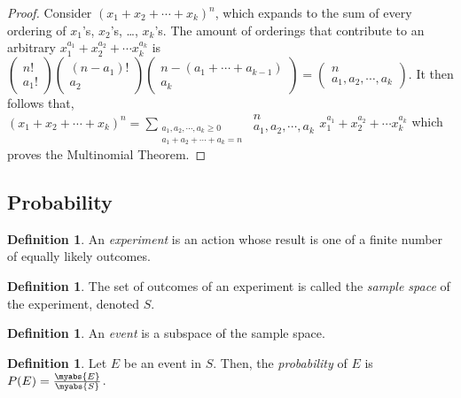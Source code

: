 \documentclass[11pt]{article}
\theoremstyle{definition}
\newtheorem{definition}[theorem]{Definition}
\begin{document}
\begin{proof}
    Consider ${(x_1+x_2+\cdots +x_k)}^n$, which expands to the sum of every ordering of $x_1$'s, $x_2$'s, \ldots, $x_k$'s. The amount of orderings that contribute to an arbitrary $x_1^{a_1} + x_2^{a_2} + \cdots x_k^{a_k}$ is $(\begin{smallmatrix} n!\\a_1! \end{smallmatrix})(\begin{smallmatrix} (n-a_1)!\\a_2 \end{smallmatrix})(\begin{smallmatrix} n-(a_1+\cdots+a_{k-1})\\a_k \end{smallmatrix}) = (\begin{smallmatrix} n \\ a_1,a_2,\cdots,a_k \end{smallmatrix})$. It then follows that, \\
        ${(x_1+x_2+\cdots+x_k)}^{n}=\sum_{\substack{a_1,a_2,\cdots,a_k \geq 0 \\ a_1+a_2+\cdots+a_k=n}}
        \begin{smallmatrix} n \\ a_1,a_2,\cdots,a_k \end{smallmatrix}
        x_1^{a_1} + x_2^{a_2} + \cdots x_k^{a_k}$ which proves the Multinomial Theorem.
\end{proof}
\subsection{Probability}
\begin{definition}
    An \emph{experiment} is an action whose result is one of a finite number of equally likely outcomes.
\end{definition}
\begin{definition}
    The set of outcomes of an experiment is called the \emph{sample space} of the experiment, denoted $S$.
\end{definition}
\begin{definition}
    An \emph{event} is a subspace of the sample space.
\end{definition}
\begin{definition}
    Let $E$ be an event in $S$. Then, the \emph{probability} of $E$ is $P(E)=\frac{\myabs{E}}{\myabs{S}}$.
\end{definition} 
\section{}
\end{document}
